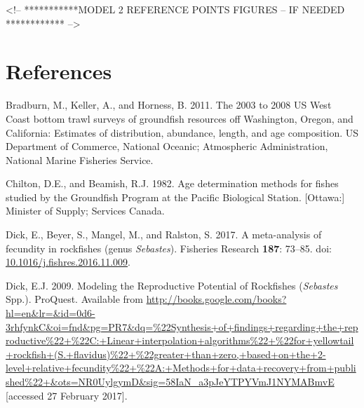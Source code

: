 \documentclass[12pt,]{article}
\begin{document}
\FloatBarrier

\FloatBarrier

\FloatBarrier

\FloatBarrier

\FloatBarrier

\FloatBarrier

\FloatBarrier
<!-- ***********MODEL 2 REFERENCE POINTS FIGURES  -- IF NEEDED ************ -->

\newpage

\color{black}

\section*{References}\label{references}

\renewcommand{\thepage}{}

\hypertarget{refs}{}
\hypertarget{ref-bradburn_2003_2011}{}
Bradburn, M., Keller, A., and Horness, B. 2011. The 2003 to 2008 US West
Coast bottom trawl surveys of groundfish resources off Washington,
Oregon, and California: Estimates of distribution, abundance, length,
and age composition. US Department of Commerce, National Oceanic;
Atmospheric Administration, National Marine Fisheries Service.

\hypertarget{ref-chilton_age_1982}{}
Chilton, D.E., and Beamish, R.J. 1982. Age determination methods for
fishes studied by the Groundfish Program at the Pacific Biological
Station. {[}Ottawa:{]} Minister of Supply; Services Canada.

\hypertarget{ref-dick_meta-analysis_2017}{}
Dick, E., Beyer, S., Mangel, M., and Ralston, S. 2017. A meta-analysis
of fecundity in rockfishes (genus \emph{Sebastes}). Fisheries Research
\textbf{187}: 73--85. doi:
\href{https://doi.org/10.1016/j.fishres.2016.11.009}{10.1016/j.fishres.2016.11.009}.

\hypertarget{ref-dick_modeling_2009}{}
Dick, E.J. 2009. Modeling the Reproductive Potential of Rockfishes
(\emph{Sebastes} Spp.). ProQuest. Available from
\url{http://books.google.com/books?hl=en\&lr=\&id=0d6-3rhfynkC\&oi=fnd\&pg=PR7\&dq=\%22Synthesis+of+findings+regarding+the+reproductive\%22+\%22C:+Linear+interpolation+algorithms\%22+\%22for+yellowtail+rockfish+(S.+flavidus)\%22+\%22greater+than+zero,+based+on+the+2-level+relative+fecundity\%22+\%22A:+Methods+for+data+recovery+from+published\%22+\&ots=NR0UylgymD\&sig=58IaN_a3pJeYTPYVmJ1NYMABmvE}
{[}accessed 27 February 2017{]}.
\end{document}
